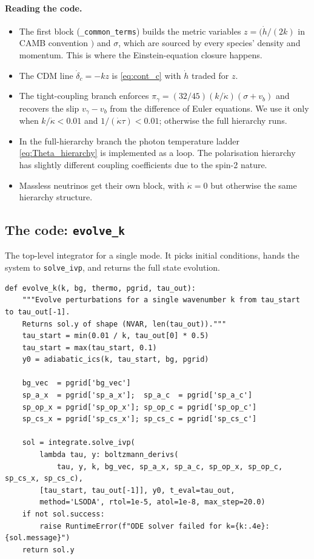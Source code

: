 \paragraph{Reading the code.}
\begin{itemize}
  \item The first block (\texttt{\_common\_terms}) builds the metric variables $z = (\dot h/(2k)$ in CAMB convention $)$ and $\sigma$, which are sourced by every species' density and momentum. This is where the Einstein-equation closure happens.
  \item The CDM line $\dot\delta_c = -kz$ is \cref{eq:cont_c} with $\dot h$ traded for $z$.
  \item The tight-coupling branch enforces $\pi_\gamma = (32/45)(k/\dot\kappa)(\sigma + v_b)$ and recovers the slip $v_\gamma - v_b$ from the difference of Euler equations. We use it only when $k/\dot\kappa < 0.01$ and $1/(\dot\kappa \tau) < 0.01$; otherwise the full hierarchy runs.
  \item In the full-hierarchy branch the photon temperature ladder \cref{eq:Theta_hierarchy} is implemented as a loop. The polarisation hierarchy has slightly different coupling coefficients due to the spin-2 nature.
  \item Massless neutrinos get their own block, with $\dot\kappa = 0$ but otherwise the same hierarchy structure.
\end{itemize}

\subsection{The code: \texttt{evolve\_k}}

The top-level integrator for a single mode. It picks initial conditions, hands the system to \texttt{solve\_ivp}, and returns the full state evolution.

\begin{codebox}
\begin{lstlisting}[style=python]
def evolve_k(k, bg, thermo, pgrid, tau_out):
    """Evolve perturbations for a single wavenumber k from tau_start to tau_out[-1].
    Returns sol.y of shape (NVAR, len(tau_out))."""
    tau_start = min(0.01 / k, tau_out[0] * 0.5)
    tau_start = max(tau_start, 0.1)
    y0 = adiabatic_ics(k, tau_start, bg, pgrid)

    bg_vec  = pgrid['bg_vec']
    sp_a_x  = pgrid['sp_a_x'];  sp_a_c  = pgrid['sp_a_c']
    sp_op_x = pgrid['sp_op_x']; sp_op_c = pgrid['sp_op_c']
    sp_cs_x = pgrid['sp_cs_x']; sp_cs_c = pgrid['sp_cs_c']

    sol = integrate.solve_ivp(
        lambda tau, y: boltzmann_derivs(
            tau, y, k, bg_vec, sp_a_x, sp_a_c, sp_op_x, sp_op_c, sp_cs_x, sp_cs_c),
        [tau_start, tau_out[-1]], y0, t_eval=tau_out,
        method='LSODA', rtol=1e-5, atol=1e-8, max_step=20.0)
    if not sol.success:
        raise RuntimeError(f"ODE solver failed for k={k:.4e}: {sol.message}")
    return sol.y
\end{lstlisting}
\end{codebox}

